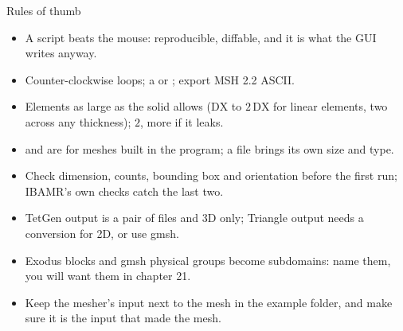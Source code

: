 \documentclass[aspectratio=169,11pt]{beamer}
\begin{document}
\begin{frame}{Rules of thumb}
\label{fr:thumb}
\small
\begin{itemize}
  \item A  script beats the mouse: reproducible, diffable, and it is what the GUI writes anyway.
  \item Counter-clockwise loops; a  or ; export MSH 2.2 ASCII.
  \item Elements as large as the solid allows ($\mathrm{DX}$ to $2\,\mathrm{DX}$ for linear elements, two across any thickness);  $2$, more if it leaks.
  \item {} and  are for meshes built in the program; a file brings its own size and type.
  \item Check dimension, counts, bounding box and orientation before the first run; IBAMR's own checks catch the last two.
  \item TetGen output is a pair of files and 3D only; Triangle output needs a conversion for 2D, or use gmsh.
  \item Exodus blocks and gmsh physical groups become subdomains: name them, you will want them in chapter 21.
  \item Keep the mesher's input next to the mesh in the example folder, and make sure it is the input that made the mesh.
\end{itemize}
\end{frame}
\end{document}
